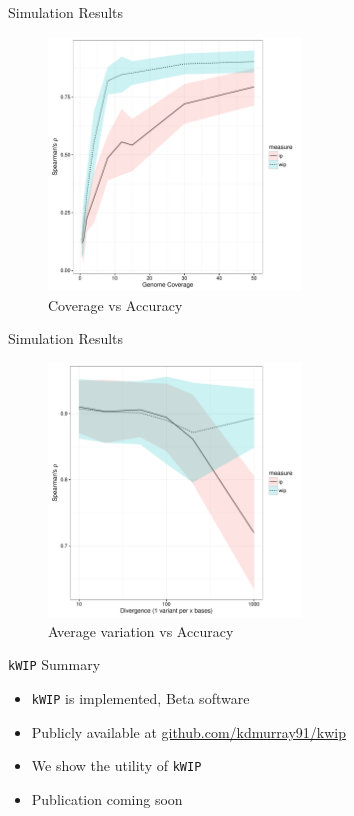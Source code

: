 \documentclass[t]{beamer}
\begin{document}
\begin{frame}{Simulation Results}
  \begin{figure}
    \centering
    \includegraphics[width=0.6\textwidth]{img/cov_vs_rho_1000.pdf}
    \caption{Coverage vs Accuracy}
  \end{figure}
\end{frame}

\begin{frame}{Simulation Results}
  \begin{figure}
    \centering
    \includegraphics[width=0.6\textwidth]{img/variation_vs_accuracy.pdf}
    \caption{Average variation vs Accuracy}
  \end{figure}
\end{frame}

\begin{frame}{\texttt{kWIP} Summary}
  \begin{itemize}
    \item \texttt{kWIP} is implemented, Beta software
    \item Publicly available at \url{github.com/kdmurray91/kwip}
    \item We show the utility of \texttt{kWIP}
    \item Publication coming soon
  \end{itemize}
\end{frame}
\end{document}
